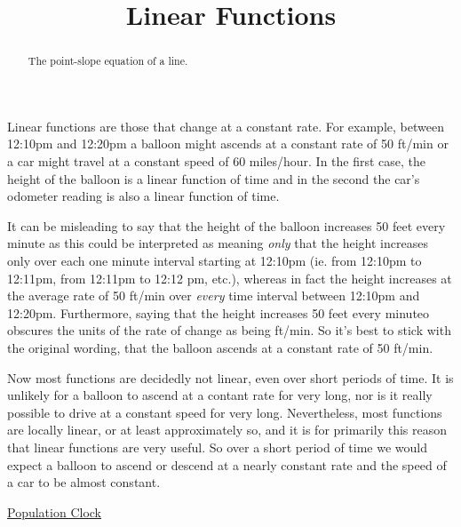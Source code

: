 \documentclass{ximera}
\title{Linear Functions}
\begin{document}
\begin{abstract}
The point-slope equation of a line.
\end{abstract}
\maketitle

Linear functions are those that change at a constant rate. For example, between 12:10pm and 12:20pm a balloon might ascends at a constant rate of 50 ft/min or a car might travel at a constant speed of 60 miles/hour. In the first case, the height of the balloon is a linear function of time and in the second the car's odometer reading is also a linear function of time.

It can be misleading to say that the height of the balloon increases 50 feet every minute as this could be interpreted as meaning \emph{only} that the height increases only over each one minute interval starting at 12:10pm (ie. from 12:10pm to 12:11pm, from 12:11pm to 12:12 pm, etc.), whereas in fact the height increases at the average rate of 50 ft/min over \emph{every} time interval between 12:10pm and 12:20pm. Furthermore, saying that the height increases 50 feet every minuteo obscures the units of the rate of change as being ft/min. So it's best to stick with the original wording, that the balloon ascends at a constant rate of 50 ft/min.

Now most functions are decidedly not linear, even over short periods of time. It is unlikely for a balloon to ascend at a contant rate for very long, nor is it really possible to drive at a constant speed for very long. Nevertheless, most functions are locally linear, or at least approximately so, and it is for primarily this reason that linear functions are very useful. So over a short period of time we would expect a balloon to ascend or descend at a nearly constant rate and the speed of a car to be almost constant. 


\href{https://www.census.gov/popclock/}{Population Clock}
\end{document}
